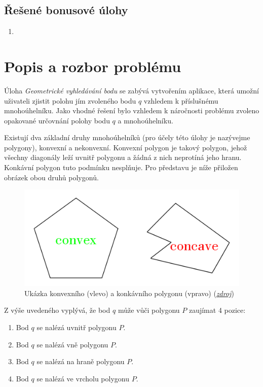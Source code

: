 \documentclass[a4paper, 12pt]{article}
\begin{document}
\subsection{Řešené bonusové úlohy}
\begin{enumerate}
\item 
\end{enumerate}


\clearpage

\section{Popis a rozbor problému}
Úloha \textit{Geometrické vyhledávání bodu} se zabývá vytvořením aplikace, která umožní uživateli zjistit polohu jím zvoleného bodu $q$ vzhledem k příslušnému mnohoúhelníku. Jako vhodné řešení bylo vzhledem k náročnosti problému zvoleno opakované určovnání polohy bodu $q$ a mnohoúhelníku.

Existují dva základní druhy mnohoúhelníků (pro účely této úlohy je nazývejme polygony), konvexní a nekonvexní. Konvexní polygon je takový polygon, jehož všechny diagonály leží uvnitř polygonu a žádná z nich neprotíná jeho hranu. Konkávní polygon tuto podmínku nesplňuje. Pro představu je níže přiložen obrázek obou druhů polygonů.

\begin{figure}[h!]
	\centering
	\includegraphics[width=13cm]{./pictures/convex_concave.png}
	\caption{Ukázka konvexního (vlevo) a konkávního polygonu (vpravo) (\href{https://www.nextgurukul.in/nganswers/ask-question/answer/What-is-concave-38-convex-polygon-/Understanding-Quadrilaterals/75323.htm}{\textsl{zdroj}})}
\end{figure}

Z výše uvedeného vyplývá, že bod $q$ může vůči polygonu $P$ zaujímat 4 pozice:
\begin{enumerate}
\item Bod $q$ se nalézá uvnitř polygonu $P$.
\item Bod $q$ se nalézá vně polygonu $P$.
\item Bod $q$ se nalézá na hraně polygonu $P$.
\item Bod $q$ se nalézá ve vrcholu polygonu $P$.
\end{enumerate}
\end{document}
